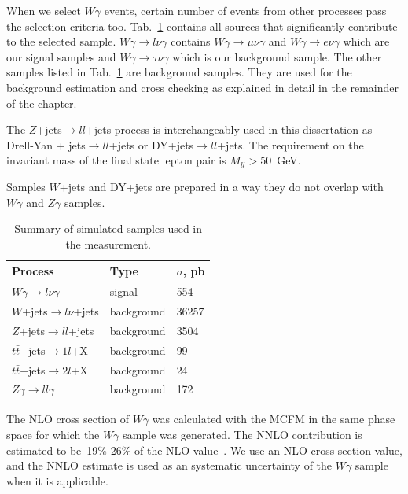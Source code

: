 When we select $W\gamma$ events, certain number of events from other processes pass the selection criteria too. Tab.~\ref{tab:mc_bkg_samples} contains all sources that significantly contribute to the selected sample. $W\gamma \rightarrow l\nu\gamma$ contains $W\gamma \rightarrow \mu\nu\gamma$ and $W\gamma \rightarrow e\nu\gamma$ which are our signal samples and $W\gamma \rightarrow \tau\nu\gamma$ which is our background sample. The other samples listed in Tab.~\ref{tab:mc_bkg_samples} are background samples. They are used for the background estimation and cross checking as explained in detail in the remainder of the chapter.

The $Z$+jets$ \rightarrow ll $+jets process is interchangeably used in this dissertation as Drell-Yan + jets$ \rightarrow ll $+jets or DY+jets$ \rightarrow ll $+jets. The requirement on the invariant mass of the final state lepton pair is $M_{ll}>50$~GeV. 

Samples $W$+jets and DY+jets are prepared in a way they do not overlap with $W\gamma$ and $Z\gamma$ samples.

\begin{table}[h]
  \small
  \begin{center}
    \caption{Summary of simulated samples used in the measurement.}
    \begin{tabular}{|l|l|l|}
      \hline
      Process                              & Type & $\sigma$, pb  \\ \hline
      $W\gamma \rightarrow l\nu\gamma$     & signal & 554   \\ \hline %
      $W$+jets$ \rightarrow l\nu $+jets   & background & 36257  \\ \hline %
      $Z$+jets$ \rightarrow ll $+jets     & background & 3504  \\ \hline
      $t\bar{t}$+jets$\rightarrow 1l$+X    & background & 99    \\ \hline %
      $t\bar{t}$+jets$\rightarrow 2l$+X    & background & 24    \\ \hline
      $Z\gamma \rightarrow ll\gamma$       & background & 172   \\ \hline
    \end{tabular}
    \label{tab:mc_bkg_samples}
  \end{center}
\end{table} 

The NLO cross section of $W\gamma$ was calculated with the MCFM in the same phase space for which the $W\gamma$ sample was generated. The NNLO contribution is estimated to be~19\%-26\% of the NLO value~\cite{ref_theory_NNLO}. We use an NLO cross section value, and the NNLO estimate is used as an systematic uncertainty of the $W\gamma$ sample when it is applicable. 

